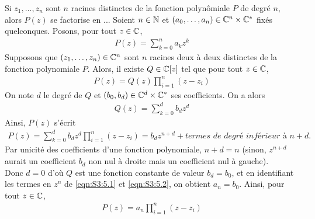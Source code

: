 \documentclass{article}
\renewenvironment{question_kholle}[2][ ]
{
	\subsection{\texorpdfstring{#2}{}}
	\notblank{#1}
	{
		\noindent #1
		\bigbreak
	}
	{}
	\begin{proof}
}
{
	\end{proof}
}
\begin{document}
\begin{question_kholle}{Si $z_1, \dots , z_n$ sont $n$ racines distinctes de la fonction polynômiale $P$ de degré $n$, alors $P(z)$ se factorise en ... }
	Soient $n\in\mathbb N$ et $(a_0,\dots,a_n)\in\mathbb C^n\times\mathbb C^*$ fixés quelconques. Posons, pour tout $z\in\mathbb C$,
	\begin{align}\label{eqn:S3:5.1}
		P(z)=\sum_{k=0}^{n}{a_kz^k}
	\end{align}
	Supposons que $(z_1,\dots,z_n)\in\mathbb C^n$ sont $n$ racines deux à deux distinctes de la fonction polynomiale $P$. Alors, il existe $Q\in\mathbb C[z]$ tel que pour tout $z\in\mathbb C$,
	\begin{align*}
		P(z)=Q(z)\prod_{i=1}^{n}{(z-z_i)}
	\end{align*}
	On note $d$ le degré de $Q$ et $(b_0, b_d)\in\mathbb C^d\times\mathbb C^*$ ses coefficients. On a alors
	\begin{align*}
		Q(z)=\sum_{k=0}^{d}{b_dz^d}
	\end{align*}
	Ainsi, $P(z)$ s'écrit
	\begin{align}\label{eqn:S3:5.2}
		P(z)=\sum_{k=0}^{d}{b_dz^d}\prod_{i=1}^{n}{(z-z_i)} = b_dz^{n+d} + \textit{termes de degré inférieur à $n+d$.}
	\end{align}
	Par unicité des coefficients d'une fonction polynomiale, $n+d=n$ (sinon, $z^{n+d}$ aurait un coefficient $b_d$ non nul à droite mais un coefficient nul à gauche).\\
	Donc $d=0$ d'où $Q$ est une fonction constante de valeur $b_d=b_0$, et en identifiant les termes en $z^n$ de \eqref{eqn:S3:5.1} et \eqref{eqn:S3:5.2}, on obtient $a_n=b_0$. Ainsi, pour tout $z\in\mathbb C$,
	\begin{align*}
		P(z)=a_n\prod_{i=1}^{n}{(z-z_i)}
	\end{align*}
\end{question_kholle}
\end{document}
